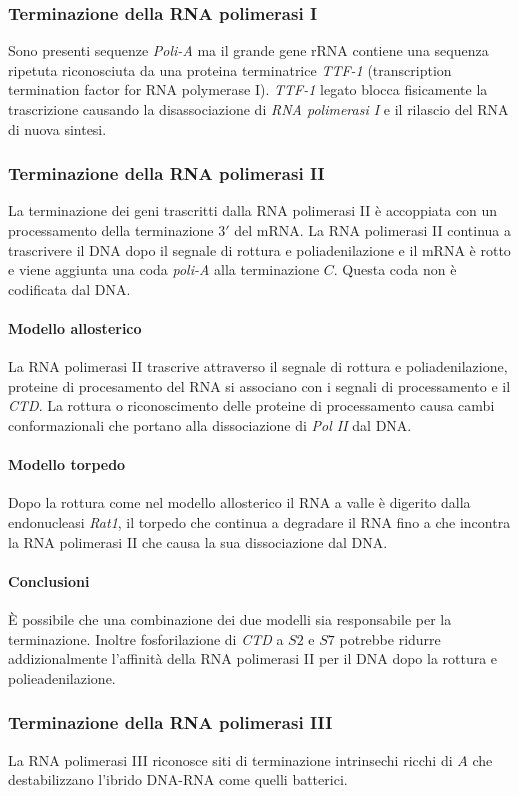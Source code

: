 \subsubsection{Terminazione della RNA polimerasi I}
Sono presenti sequenze \emph{Poli-A} ma il grande gene rRNA contiene una sequenza ripetuta riconosciuta da una proteina terminatrice \emph{TTF-1} (transcription termination factor for
RNA polymerase I). \emph{TTF-1} legato blocca fisicamente la trascrizione causando la disassociazione di \emph{RNA polimerasi I} e il rilascio del RNA di nuova sintesi. 
\subsubsection{Terminazione della RNA polimerasi II}
La terminazione dei geni trascritti dalla RNA polimerasi II \`e accoppiata con un processamento della terminazione $3'$ del mRNA. La RNA polimerasi II continua a trascrivere il DNA
dopo il segnale di rottura e poliadenilazione e il mRNA \`e rotto e viene aggiunta una coda \emph{poli-A} alla terminazione $C$. Questa coda non \`e codificata dal DNA. 
\paragraph{Modello allosterico}
La RNA polimerasi II trascrive attraverso il segnale di rottura e poliadenilazione, proteine di procesamento del RNA si associano con i segnali di processamento e il \emph{CTD}. La 
rottura o riconoscimento delle proteine di processamento causa cambi conformazionali che portano alla dissociazione di \emph{Pol II} dal DNA. 
\paragraph{Modello torpedo}
Dopo la rottura come nel modello allosterico il RNA a valle \`e digerito dalla endonucleasi \emph{Rat1}, il torpedo che continua a degradare il RNA fino a che incontra la RNA 
polimerasi II che causa la sua dissociazione dal DNA. 
\paragraph{Conclusioni}
\`E possibile che una combinazione dei due modelli sia responsabile per la terminazione. Inoltre fosforilazione di \emph{CTD} a $S2$ e $S7$ potrebbe ridurre addizionalmente 
l'affinit\`a della RNA polimerasi II per il DNA dopo la rottura e polieadenilazione. 
\subsubsection{Terminazione della RNA polimerasi III}
La RNA polimerasi III riconosce siti di terminazione intrinsechi ricchi di $A$ che destabilizzano l'ibrido DNA-RNA come quelli batterici. 
